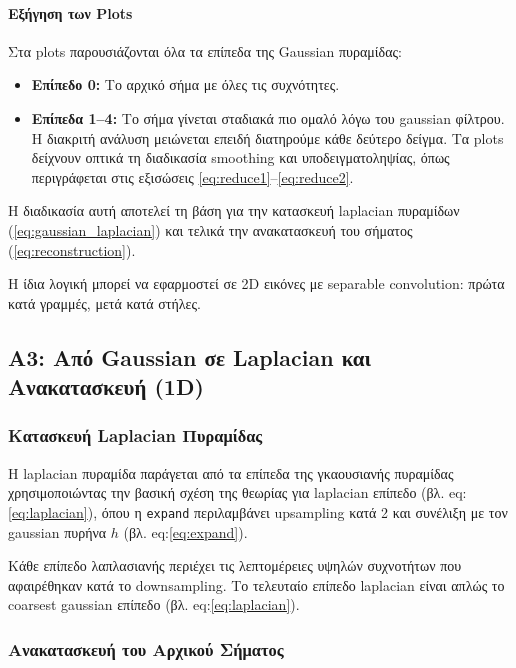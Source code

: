 \documentclass[12pt]{article}
\begin{document}
\paragraph{Εξήγηση των Plots}\mbox{} 

Στα plots παρουσιάζονται όλα τα επίπεδα της Gaussian πυραμίδας:
\begin{itemize}
    \item \textbf{Επίπεδο 0:} Το αρχικό σήμα με όλες τις συχνότητες.
    \item \textbf{Επίπεδα 1–4:} Το σήμα γίνεται σταδιακά πιο ομαλό λόγω του gaussian φίλτρου. Η διακριτή ανάλυση μειώνεται επειδή διατηρούμε κάθε δεύτερο δείγμα.  
    Τα plots δείχνουν οπτικά τη διαδικασία smoothing και υποδειγματοληψίας, όπως περιγράφεται στις εξισώσεις \eqref{eq:reduce1}–\eqref{eq:reduce2}.
\end{itemize}

Η διαδικασία αυτή αποτελεί τη βάση για την κατασκευή laplacian πυραμίδων (\eqref{eq:gaussian_laplacian}) και τελικά την ανακατασκευή του σήματος (\eqref{eq:reconstruction}).  

Η ίδια λογική μπορεί να εφαρμοστεί σε 2D εικόνες με separable convolution: πρώτα κατά γραμμές, μετά κατά στήλες.










\subsection{A3: Από Gaussian σε Laplacian και Ανακατασκευή (1D)}
\label{sec:a3}

\subsubsection{Κατασκευή Laplacian Πυραμίδας}

Η laplacian πυραμίδα παράγεται από τα επίπεδα της γκαουσιανής πυραμίδας χρησιμοποιώντας την βασική σχέση της θεωρίας για laplacian επίπεδο (βλ. eq:\ref{eq:laplacian}), όπου η \texttt{expand} περιλαμβάνει upsampling κατά 2 και συνέλιξη με τον gaussian πυρήνα $h$ (βλ. eq:\ref{eq:expand}).  

Κάθε επίπεδο λαπλασιανής περιέχει τις λεπτομέρειες υψηλών συχνοτήτων που αφαιρέθηκαν κατά το downsampling. Το τελευταίο επίπεδο laplacian είναι απλώς το coarsest gaussian επίπεδο (βλ. eq:\ref{eq:laplacian}).

\subsubsection{Ανακατασκευή του Αρχικού Σήματος}
\end{document}
